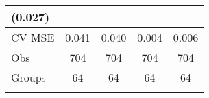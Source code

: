 \documentclass[12pt,twoside]{reedthesis}
\begin{document}
\begin{longtable}[]{@{}lcccc@{}}
\begin{minipage}[t]{0.14\columnwidth}
  (0.027)\strut
  \end{minipage}\tabularnewline
  \midrule
  \begin{minipage}[t]{0.26\columnwidth}\raggedright\strut
  CV MSE\strut
  \end{minipage} & \begin{minipage}[t]{0.12\columnwidth}\centering\strut
  0.041\strut
  \end{minipage} & \begin{minipage}[t]{0.13\columnwidth}\centering\strut
  0.040\strut
  \end{minipage} & \begin{minipage}[t]{0.14\columnwidth}\centering\strut
  0.004\strut
  \end{minipage} & \begin{minipage}[t]{0.14\columnwidth}\centering\strut
  0.006\strut
  \end{minipage}\tabularnewline
  \begin{minipage}[t]{0.26\columnwidth}\raggedright\strut
  Obs\strut
  \end{minipage} & \begin{minipage}[t]{0.12\columnwidth}\centering\strut
  704\strut
  \end{minipage} & \begin{minipage}[t]{0.13\columnwidth}\centering\strut
  704\strut
  \end{minipage} & \begin{minipage}[t]{0.14\columnwidth}\centering\strut
  704\strut
  \end{minipage} & \begin{minipage}[t]{0.14\columnwidth}\centering\strut
  704\strut
  \end{minipage}\tabularnewline
  \begin{minipage}[t]{0.26\columnwidth}\raggedright\strut
  Groups\strut
  \end{minipage} & \begin{minipage}[t]{0.12\columnwidth}\centering\strut
  64\strut
  \end{minipage} & \begin{minipage}[t]{0.13\columnwidth}\centering\strut
  64\strut
  \end{minipage} & \begin{minipage}[t]{0.14\columnwidth}\centering\strut
  64\strut
  \end{minipage} & \begin{minipage}[t]{0.14\columnwidth}\centering\strut
  64\strut
  \end{minipage}\tabularnewline
  \bottomrule
  \addlinespace
  \multicolumn{5}{c}{** $ p<0.01 $; * $ p<0.05 $} \\
  \end{longtable}
  
\end{document}
